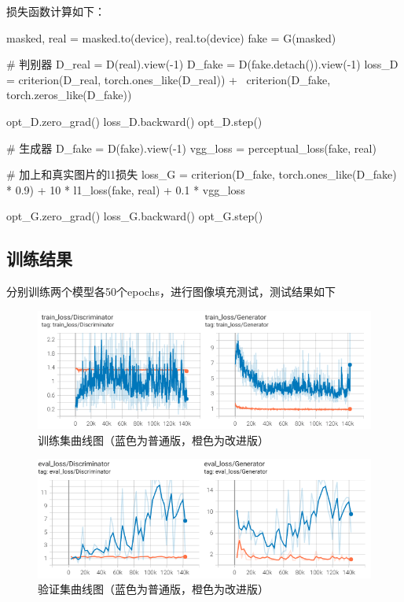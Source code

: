 \documentclass[12pt, a4paper, oneside]{ctexart}
\numberwithin{equation}{section}  %
\begin{document}
损失函数计算如下：
\begin{pythoncode}
masked, real = masked.to(device), real.to(device)
fake = G(masked)

# 判别器
D_real = D(real).view(-1)
D_fake = D(fake.detach()).view(-1)
loss_D = criterion(D_real, torch.ones_like(D_real)) + \
            criterion(D_fake, torch.zeros_like(D_fake))

opt_D.zero_grad()
loss_D.backward()
opt_D.step()

# 生成器
D_fake = D(fake).view(-1)
vgg_loss = perceptual_loss(fake, real)

# 加上和真实图片的l1损失
loss_G = criterion(D_fake, torch.ones_like(D_fake) * 0.9) + 10 * l1_loss(fake, real) + 0.1 * vgg_loss

opt_G.zero_grad()
loss_G.backward()
opt_G.step()
\end{pythoncode}
\subsection{训练结果}
分别训练两个模型各50个epochs，进行图像填充测试，测试结果如下
\begin{figure}[htbp]
    \centering
    \includegraphics[width=\linewidth]{hw2_train_loss.png}
    \caption{训练集曲线图（蓝色为普通版，橙色为改进版）}
\end{figure}
\begin{figure}[htbp]
    \centering
    \includegraphics[width=\linewidth]{hw2_eval_loss.png}
    \caption{验证集曲线图（蓝色为普通版，橙色为改进版）}
\end{figure}
\end{document}
